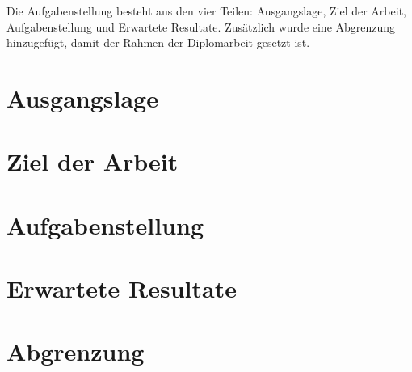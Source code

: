   Die Aufgabenstellung besteht aus den vier Teilen: Ausgangslage, Ziel der
  Arbeit, Aufgabenstellung und Erwartete Resultate. Zusätzlich wurde eine
  Abgrenzung hinzugefügt, damit der Rahmen der Diplomarbeit gesetzt ist.
  
  \section{Ausgangslage}
  
  
  
  \section{Ziel der Arbeit}

  
  
  \section{Aufgabenstellung}
  
  
  
  \section{Erwartete Resultate}
  
  
  
  \section{Abgrenzung}
  
  